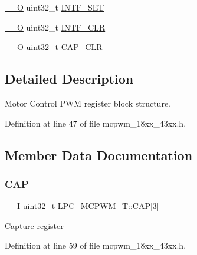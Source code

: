 \begin{DoxyCompactItemize}
\item 
\hyperlink{core__sc300_8h_a7e25d9380f9ef903923964322e71f2f6}{\+\_\+\+\_\+O} uint32\+\_\+t \hyperlink{struct_l_p_c___m_c_p_w_m___t_a4c129a22156572b5671ff0e8b9f1977d}{I\+N\+T\+F\+\_\+\+S\+ET}
\item 
\hyperlink{core__sc300_8h_a7e25d9380f9ef903923964322e71f2f6}{\+\_\+\+\_\+O} uint32\+\_\+t \hyperlink{struct_l_p_c___m_c_p_w_m___t_acd49890931c9446a54e8070478cf7185}{I\+N\+T\+F\+\_\+\+C\+LR}
\item 
\hyperlink{core__sc300_8h_a7e25d9380f9ef903923964322e71f2f6}{\+\_\+\+\_\+O} uint32\+\_\+t \hyperlink{struct_l_p_c___m_c_p_w_m___t_a88da2eb831f09cf7145f57c45b224e91}{C\+A\+P\+\_\+\+C\+LR}
\end{DoxyCompactItemize}


\subsection{Detailed Description}
Motor Control P\+WM register block structure. 

Definition at line 47 of file mcpwm\+\_\+18xx\+\_\+43xx.\+h.



\subsection{Member Data Documentation}
\mbox{\label{struct_l_p_c___m_c_p_w_m___t_a015a4607abaca03f64acaeae4a0ccaf7}} 
\subsubsection{\texorpdfstring{C\+AP}{CAP}}
{\footnotesize\ttfamily \hyperlink{core__sc300_8h_af63697ed9952cc71e1225efe205f6cd3}{\+\_\+\+\_\+I} uint32\+\_\+t L\+P\+C\+\_\+\+M\+C\+P\+W\+M\+\_\+\+T\+::\+C\+AP\mbox{[}3\mbox{]}}

Capture register 

Definition at line 59 of file mcpwm\+\_\+18xx\+\_\+43xx.\+h.

\mbox{\label{struct_l_p_c___m_c_p_w_m___t_a88da2eb831f09cf7145f57c45b224e91}} 
